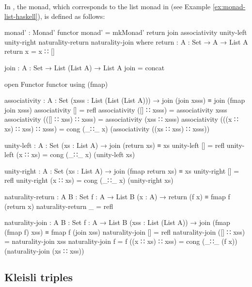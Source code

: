 \begin{example}
  \label{ex:monad-list-agda}

  In \agda, the  monad, which corresponds to the list
  monad in \hask (see Example \ref{ex:monad-list-haskell}), is defined
  as follows:
  \begin{codeagda}
monad' : Monad' functor
monad' = mkMonad' return join associativity unity-left unity-right
                  naturality-return naturality-join
  where
    return : {A : Set} → A → List A
    return x = x ∷ []

    join : {A : Set} → List (List A) → List A
    join = concat

    open Functor functor using (fmap)

    associativity : {A : Set} (xsss : List (List (List A))) →
                    join (join xsss) ≡ join (fmap join xsss)
    associativity []                        = refl
    associativity ([] ∷ xsss)               = associativity xsss
    associativity (([] ∷ xss) ∷ xsss)       = associativity (xss ∷ xsss)
    associativity (((x ∷ xs) ∷ xss) ∷ xsss) =
      cong (_∷_ x) (associativity ((xs ∷ xss) ∷ xsss))

    unity-left : {A : Set} (xs : List A) → join (return xs) ≡ xs
    unity-left []       = refl
    unity-left (x ∷ xs) = cong (_∷_ x) (unity-left xs)

    unity-right : {A : Set} (xs : List A) → join (fmap return xs) ≡ xs
    unity-right []       = refl
    unity-right (x ∷ xs) = cong (_∷_ x) (unity-right xs)

    naturality-return : {A B : Set} {f : A → List B} (x : A) →
                        return (f x) ≡ fmap f (return x)
    naturality-return _ = refl

    naturality-join : {A B : Set} {f : A → List B} (xss : List (List A)) →
                      join (fmap (fmap f) xss) ≡ fmap f (join xss)
    naturality-join         []               = refl
    naturality-join         ([] ∷ xss)       = naturality-join xss
    naturality-join {f = f} ((x ∷ xs) ∷ xss) =
      cong (_∷_ (f x)) (naturality-join (xs ∷ xss))
  \end{codeagda}

\end{example}

\subsection*{Kleisli triples}

